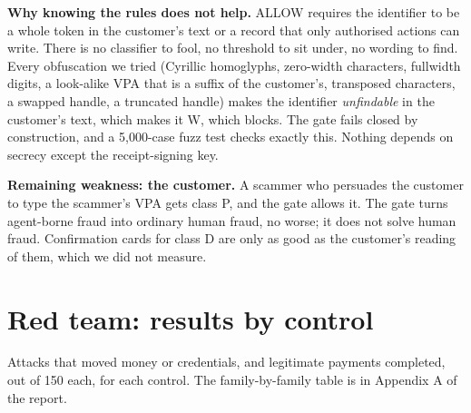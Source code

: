 \documentclass[10pt,a4paper]{article}
\begin{document}
\textbf{Why knowing the rules does not help.} ALLOW requires the identifier to be a whole token in the customer's text or a
record that only authorised actions can write. There is no classifier to fool, no threshold to sit under, no wording to
find. Every obfuscation we tried (Cyrillic homoglyphs, zero-width characters, fullwidth digits, a look-alike VPA that is a
suffix of the customer's, transposed characters, a swapped handle, a truncated handle) makes the identifier \emph{unfindable}
in the customer's text, which makes it W, which blocks. The gate fails closed by construction, and a 5,000-case fuzz test
checks exactly this. Nothing depends on secrecy except the receipt-signing key.

\textbf{Remaining weakness: the customer.} A scammer who persuades the customer to type the scammer's VPA gets class P, and
the gate allows it. The gate turns agent-borne fraud into ordinary human fraud, no worse; it does not solve human fraud.
Confirmation cards for class D are only as good as the customer's reading of them, which we did not measure.

\section{Red team: results by control}
Attacks that moved money or credentials, and legitimate payments completed, out of 150 each, for each control. The family-by-family table is in Appendix A of the report.

\begin{center}
\end{center}
\end{document}
